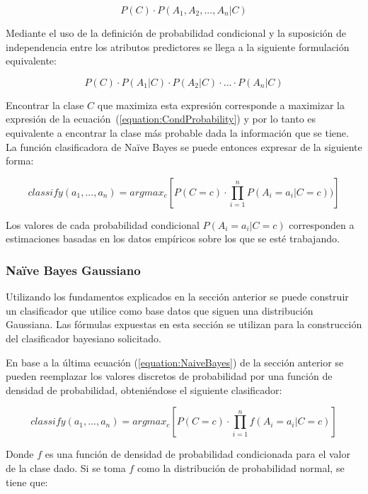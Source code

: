 \documentclass[letter, titlepage, 10pt]{article}
\begin{document}
\begin{equation}
P(C)\cdot P(A_1,A_2,...,A_n|C)
\end{equation}

Mediante el uso de la definición de probabilidad condicional y la suposición de independencia entre los atributos predictores se llega a la siguiente formulación equivalente:

\begin{equation}
P(C)\cdot P(A_1|C)\cdot P(A_2|C) \cdot...\cdot P(A_n|C)
\end{equation}

Encontrar la clase $C$ que maximiza esta expresión corresponde a maximizar la expresión de la ecuación~(\ref{equation:CondProbability}) y por lo tanto es equivalente a encontrar la clase más probable dada la información que se tiene.
La función clasificadora de Naïve Bayes se puede entonces expresar de la siguiente forma:

\begin{equation} \label{equation:NaiveBayes}
classify(a_1,...,a_n) = argmax_{c}\left[P(C = c)\cdot \prod\limits_{i=1}^n P(A_i = a_i|C = c))\right]
\end{equation}

Los valores de cada probabilidad condicional $P(A_i = a_i|C = c)$ corresponden a estimaciones basadas en los datos empíricos sobre los que se esté trabajando.

	\subsubsection{Naïve Bayes Gaussiano}
Utilizando los fundamentos explicados en la sección anterior se puede construir un clasificador que utilice como base datos que siguen una distribución Gaussiana. Las fórmulas expuestas en esta sección se utilizan para la construcción del clasificador bayesiano solicitado.

En base a la última ecuación (\ref{equation:NaiveBayes}) de la sección anterior se pueden reemplazar los valores discretos de probabilidad por una función de densidad de probabilidad, obteniéndose el siguiente clasificador:

\begin{equation}
classify(a_1,...,a_n) = argmax_{c}\left[P(C = c)\cdot \prod\limits_{i=1}^n f(A_i = a_i|C = c)\right]
\end{equation}

Donde $f$ es una función de densidad de probabilidad condicionada para el valor de la clase dado. Si se toma $f$ como la distribución de probabilidad normal, se tiene que:
\end{document}
